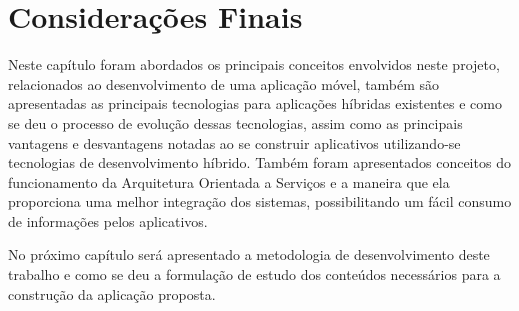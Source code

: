 \section{Considerações Finais}\label{sec:consideracoes-finais}

Neste capítulo foram abordados os principais conceitos envolvidos neste projeto, relacionados ao desenvolvimento de uma aplicação móvel, também são apresentadas as principais tecnologias para aplicações híbridas existentes e como se deu o processo de evolução dessas tecnologias, assim como as principais vantagens e desvantagens notadas ao se construir aplicativos utilizando-se tecnologias de desenvolvimento híbrido.
Também foram apresentados conceitos do funcionamento da Arquitetura Orientada a Serviços e a maneira que ela proporciona uma melhor integração dos sistemas, possibilitando um fácil consumo de informações pelos aplicativos.

No próximo capítulo será apresentado a metodologia de desenvolvimento deste trabalho e como se deu a formulação de estudo dos conteúdos necessários para a construção da aplicação proposta.